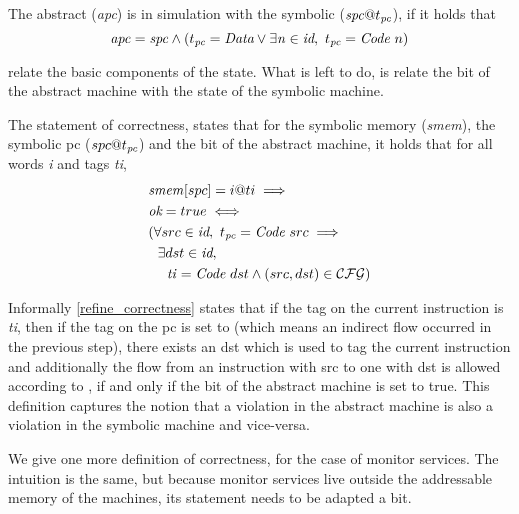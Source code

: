 \begin{definition}[PC simulation]
  \label{refine_pc}
  The abstract \pc (\textit{apc}) is in simulation with the symbolic \pc
  ($\mathit{spc}@t_{\textit{pc}}$), if it holds that
  $$\mathit{apc} = \mathit{spc} \land
    (t_{\textit{pc}} = \textit{Data} \lor \exists\mathit{n \in \textit{id}},~
    t_{\textit{pc}} = \textit{Code}~n)$$
\end{definition}

 relate the basic
components of the state.  What is left to do, is relate the \ok bit of
the abstract machine with the state of the symbolic machine.

\begin{definition}[Correctness]
  \label{refine_correctness}
  The statement of correctness, states that for the symbolic memory
  (\textit{smem}), the symbolic pc ($spc@t_{\textit{pc}}$) and the \ok bit
  of the abstract machine, it holds that for all words \textit{i} and
  tags \textit{ti},
  \begin{align*}
     & \mathit{smem}[spc] = i@ti \implies \\
     & \textit{ok} = true  \iff \\
     & (\forall src \in \textit{id}, ~ t_{\textit{pc}} = \textit{Code}~src \implies  \\
     & ~~\exists dst \in \textit{id}, \\
     & ~~~~ \mathit{ti} = \textit{Code}~dst \land (src,dst) \in \mathcal{CFG})
    \end{align*}
\end{definition}

Informally \cref{refine_correctness} states that if the tag on the
current instruction is \textit{ti}, then if the tag on the pc is set
to  (which means an indirect flow occurred in the previous
step), there exists an \id dst which is used to tag the current
instruction and additionally the flow from an instruction with \id src
to one with \id dst is allowed according to \CFG, if and only if the
\ok bit of the abstract machine is set to true. This definition
captures the notion that a violation in the abstract machine is also a
violation in the symbolic machine and vice-versa.

We give one more definition of correctness, for the case of monitor
services. The intuition is the same, but because monitor services
live outside the addressable memory of the machines, its statement
needs to be adapted a bit.

